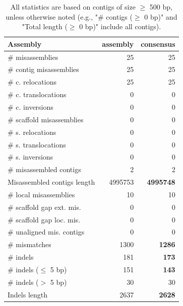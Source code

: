 \documentclass[12pt,a4paper]{article}
\begin{document}
\begin{table}[ht]
\begin{center}
\caption{All statistics are based on contigs of size $\geq$ 500 bp, unless otherwise noted (e.g., "\# contigs ($\geq$ 0 bp)" and "Total length ($\geq$ 0 bp)" include all contigs).}
\begin{tabular}{|l*{2}{|r}|}
\hline
Assembly & assembly & consensus \\ \hline
\# misassemblies & 25 & 25 \\ \hline
\hspace{2mm}\# contig misassemblies & 25 & 25 \\ \hline
\hspace{5mm}\# c. relocations & 25 & 25 \\ \hline
\hspace{5mm}\# c. translocations & 0 & 0 \\ \hline
\hspace{5mm}\# c. inversions & 0 & 0 \\ \hline
\hspace{2mm}\# scaffold misassemblies & 0 & 0 \\ \hline
\hspace{5mm}\# s. relocations & 0 & 0 \\ \hline
\hspace{5mm}\# s. translocations & 0 & 0 \\ \hline
\hspace{5mm}\# s. inversions & 0 & 0 \\ \hline
\# misassembled contigs & 2 & 2 \\ \hline
Misassembled contigs length & 4995753 & {\bf 4995748} \\ \hline
\# local misassemblies & 10 & 10 \\ \hline
\# scaffold gap ext. mis. & 0 & 0 \\ \hline
\# scaffold gap loc. mis. & 0 & 0 \\ \hline
\# unaligned mis. contigs & 0 & 0 \\ \hline
\# mismatches & 1300 & {\bf 1286} \\ \hline
\# indels & 181 & {\bf 173} \\ \hline
\hspace{5mm}\# indels ($\leq$ 5 bp) & 151 & {\bf 143} \\ \hline
\hspace{5mm}\# indels ($>$ 5 bp) & 30 & 30 \\ \hline
Indels length & 2637 & {\bf 2628} \\ \hline
\end{tabular}
\end{center}
\end{table}
\end{document}
